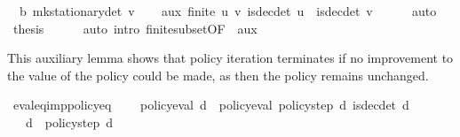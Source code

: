 \begin{isabellebody}
\ \ {\isasymnu}\isactrlsub b\ {\isacharparenleft}{\kern0pt}mk{\isacharunderscore}{\kern0pt}stationary{\isacharunderscore}{\kern0pt}det\ v{\isacharparenright}{\kern0pt}{\isacharbraceright}{\kern0pt}{\isachardoublequoteclose}\isanewline
%
\isadelimproof
%
\endisadelimproof
%
\isatagproof
{}\isamarkupfalse%
{\isacharminus}{\kern0pt}\isanewline
\ \ \isamarkupfalse%
\ aux{\isacharcolon}{\kern0pt}\ {\isachardoublequoteopen}finite\ {\isacharbraceleft}{\kern0pt}{\isacharparenleft}{\kern0pt}u{\isacharcomma}{\kern0pt}\ v{\isacharparenright}{\kern0pt}{\isachardot}{\kern0pt}\ is{\isacharunderscore}{\kern0pt}dec{\isacharunderscore}{\kern0pt}det\ u\ {\isasymand}\ is{\isacharunderscore}{\kern0pt}dec{\isacharunderscore}{\kern0pt}det\ v{\isacharbraceright}{\kern0pt}{\isachardoublequoteclose}\isanewline
\ \ \ \ \isamarkupfalse%
\ auto\isanewline
\ \ \isamarkupfalse%
\ {\isacharquery}{\kern0pt}thesis\isanewline
\ \ \ \ \isamarkupfalse%
\ {\isacharparenleft}{\kern0pt}auto\ intro{\isacharcolon}{\kern0pt}\ finite{\isacharunderscore}{\kern0pt}subset{\isacharbrackleft}{\kern0pt}OF\ {\isacharunderscore}{\kern0pt}\ aux{\isacharbrackright}{\kern0pt}{\isacharparenright}{\kern0pt}\isanewline
{}\isamarkupfalse%
%
\endisatagproof
{\isafoldproof}%
%
\isadelimproof
%
\endisadelimproof
%
\begin{isamarkuptext}%
This auxiliary lemma shows that policy iteration terminates if no improvement to the value of 
the policy could be made, as then the policy remains unchanged.%
\end{isamarkuptext}\isamarkuptrue%
\isamarkupfalse%
\ eval{\isacharunderscore}{\kern0pt}eq{\isacharunderscore}{\kern0pt}imp{\isacharunderscore}{\kern0pt}policy{\isacharunderscore}{\kern0pt}eq{\isacharcolon}{\kern0pt}\ \isanewline
\ \ \ {\isachardoublequoteopen}policy{\isacharunderscore}{\kern0pt}eval\ d\ {\isacharequal}{\kern0pt}\ policy{\isacharunderscore}{\kern0pt}eval\ {\isacharparenleft}{\kern0pt}policy{\isacharunderscore}{\kern0pt}step\ d{\isacharparenright}{\kern0pt}{\isachardoublequoteclose}\ {\isachardoublequoteopen}is{\isacharunderscore}{\kern0pt}dec{\isacharunderscore}{\kern0pt}det\ d{\isachardoublequoteclose}\isanewline
\ \ \ {\isachardoublequoteopen}d\ {\isacharequal}{\kern0pt}\ policy{\isacharunderscore}{\kern0pt}step\ d{\isachardoublequoteclose}\isanewline
%
\isadelimproof
%
\endisadelimproof
%
\isatagproof
{}\isamarkupfalse%
\ {\isacharminus}{\kern0pt}\isanewline
\ \ \isamarkupfalse%

\end{isabellebody}
